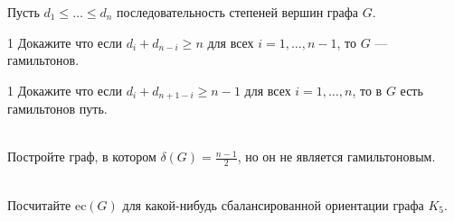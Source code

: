 \documentclass[a4paper,12pt,twoside]{article}
\begin{document}
\begin{?}
    Пусть \(d_1 \leq \ldots \leq d_n\) последовательность степеней вершин графа \(G\). 
    \begin{tasklist}
        \item[1] Докажите что если \(d_i + d_{n - i} \geq n\) для всех \(i = 1, \ldots, n - 1\), то \(G\) --- гамильтонов.
        \item[1] Докажите что если \(d_i + d_{n + 1 - i} \geq n - 1\) для всех \(i = 1, \ldots, n\), то в \(G\) есть гамильтонов путь.
    \end{tasklist}
\end{?}
\begin{?}\ \\
     Постройте граф, в котором  \(\delta(G) = \frac{n - 1}{2}\), но он не является гамильтоновым.
\end{?}
\begin{?}\ \\
     Посчитайте \(\mathrm{ec}(G)\) для какой-нибудь сбалансированной ориентации графа \(K_5\).
\end{?}
\end{document}
